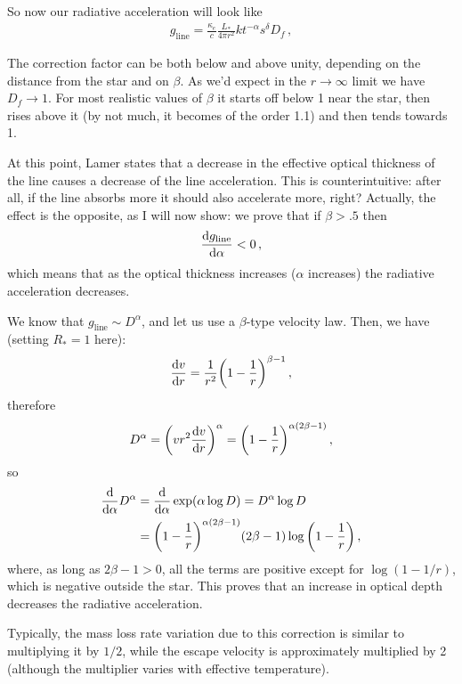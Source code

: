 \documentclass[main.tex]{subfiles}
\begin{document}
So now our radiative acceleration will look like 
%
\begin{align}
g _{\text{line}} = \frac{\kappa_{e}}{c}\frac{L_{*}}{4 \pi r^2} k t^{-\alpha } s^{ \delta } D_f
\,,
\end{align}
%


The correction factor can be both below and above unity, depending on the distance from the star and on \(\beta \). 
As we'd expect in the \(r \rightarrow \infty \) limit we have \(D_f \rightarrow 1\). 
For most realistic values of \(\beta \) it starts off below 1 near the star, then rises above it (by not much, it becomes of the order \num{1.1}) and then tends towards 1.

\begin{bluebox}
At this point, Lamer states that a decrease in the effective optical thickness of the line causes a decrease of the line acceleration. 
This is counterintuitive: after all, if the line absorbs more it should also accelerate more, right?
Actually, the effect is the opposite, as I will now show: we prove that if \(\beta > .5\) then
%
\begin{align}
\dv{g _{\text{line}}}{\alpha } < 0
\,,
\end{align}
%
which means that as the optical thickness increases (\(\alpha \) increases) the radiative acceleration decreases.

We know that \(g _{\text{line}} \sim D^{\alpha }\), and let us use a \(\beta \)-type velocity law. Then, we have (setting \(R_{*} =1\) here):
%
\begin{align}
\dv{v}{r} = \frac{1}{r^2} \qty(1 - \frac{1}{r})^{\beta -1}
\,,
\end{align}
%
therefore 
%
\begin{align}
D^{\alpha } = \qty(v r^2 \dv{v}{r})^{\alpha}
= \qty(1 - \frac{1}{r})^{\alpha (2\beta -1)}
\,,
\end{align}
%
so 
%
\begin{align}
\dv{}{\alpha } D^{\alpha }
&= \dv{}{\alpha } \exp(\alpha \log D)
= D^{\alpha } \log D  \\
&= \qty(1 - \frac{1}{r})^{\alpha (2 \beta -1)}
(2 \beta -1 ) \log \qty(1 - \frac{1}{r})
\,,
\end{align}
%
where, as long as \(2 \beta -1 >0\), all the terms are positive except for \(\log (1 - 1/r)\), which is negative outside the star.
This proves that an increase in optical depth decreases the radiative acceleration.
\end{bluebox}

Typically, the mass loss rate variation due to this correction is similar to multiplying it by \(1/2\), while the escape velocity is approximately multiplied by 2 (although the multiplier varies with effective temperature).
\end{document}
